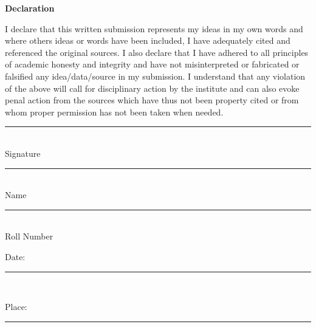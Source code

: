 \documentclass[a4paper,12pt]{report}
\begin{document}
\def\title{Word Sense Induction, Disambiguation for Search Result organization }
\def\what{M. Tech. Thesis}
\def\degree{Master~of~Technology}
\def\who{Rakesh Dhanireddy}
\def\roll{10305069}
\def\guide{Prof. Ganesh Ramakrishnan, Prof. Saketha Nath}

\titlpage
\def\bsq{\begin{flushright} $\blacksquare$\\ \end{flushright}}
\def\tab{\hspace{5mm}}

 
\newpage

\begin{center}
 \textbf{Declaration}
\end{center}
I declare that this written submission represents my ideas in my own
words and where others ideas or words have been included, I have
adequately cited and referenced the original sources. I also declare
that I have adhered to all principles of academic honesty and
integrity and have not misinterpreted or fabricated or falsified any
idea/data/source in my submission. I understand that any violation of
the above will call for disciplinary action by the institute and can
also evoke penal action from the sources which have thus not been
property cited or from whom proper permission has not been taken when
needed.
   \vspace{1cm}
 \begin{flushright}
 \rule{150pt}{1pt}\\ 
 
 Signature\\
 \vspace{1cm}
 \rule{150pt}{1pt} \\
 
 Name\\
 \vspace{1cm}
 \rule{150pt}{1pt} \\
 
 Roll Number\\
 
 \end{flushright}
 
 \begin{flushleft}
 Date: \rule{150pt}{1pt} \\
 \vspace{1cm}
  
 Place: \rule{150pt}{1pt} \\
 \end{flushleft}
\end{document}

